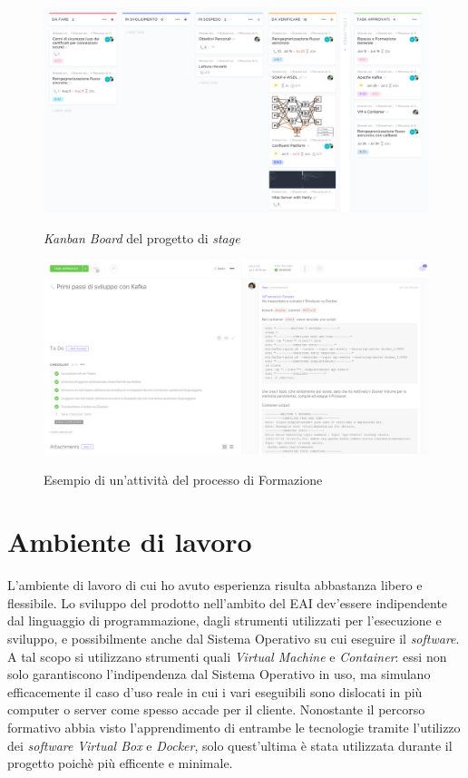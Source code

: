 \bigskip
\begin{figure}[h]
  \includegraphics[width=\textwidth]{images/clickup_board_v2.png}\\
  \caption{\textit{Kanban Board} del progetto di \textit{stage}}
\end{figure}
\begin{figure}[H]
  \includegraphics[width=\textwidth]{images/clickup_task_v2.png}\\
  \caption{Esempio di un'attività del processo di Formazione}
\end{figure}

\section{Ambiente di lavoro}

L'ambiente di lavoro di cui ho avuto esperienza risulta abbastanza libero e flessibile.
Lo sviluppo del prodotto nell'ambito del EAI dev'essere indipendente dal linguaggio di programmazione, dagli strumenti utilizzati per l'esecuzione e sviluppo, e possibilmente anche dal Sistema Operativo su cui eseguire il \textit{software}.
A tal scopo si utilizzano strumenti quali \textit{Virtual Machine} e \textit{Container}: essi non solo garantiscono l'indipendenza dal Sistema Operativo in uso, ma simulano efficacemente il caso d'uso reale in cui i vari eseguibili sono dislocati in più computer o server come spesso accade per il cliente.
Nonostante il percorso formativo abbia visto l'apprendimento di entrambe le tecnologie tramite l'utilizzo dei \textit{software} \textit{Virtual Box} e \textit{Docker}, solo quest'ultima è stata utilizzata durante il progetto poichè più efficente e minimale.
